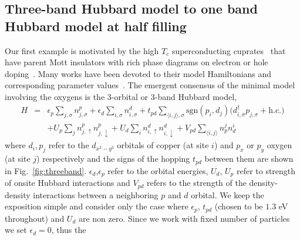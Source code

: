 \subsection{Three-band Hubbard model to one band Hubbard model at half filling}
\label{subsection:3band} 
Our first example is motivated by the high $T_c$ superconducting cuprates~\cite{Bednorz1986} that 
have parent Mott insulators with rich phase diagrams on electron or hole doping~\cite{Dagotto_RevModPhys, LeeWen_RevModPhys}. 
Many works have been devoted to their model Hamiltonians and corresponding parameter 
values~\cite{Emery, ZhangRice, tJSpalek, Hybertsen_PRB1989, Hybertsen_PRB1990, Pavirini, Kent_Hubbard}. 
The emergent consensus of the minimal model involving the oxygens is the 3-orbital or 3-band Hubbard model, 
\begin{eqnarray}
H &=&    \epsilon_p \sum_{j,\sigma} n^{p}_{j,\sigma} + \epsilon_{d} \sum_{i,\sigma}  n^{d}_{i,\sigma} 
	+ t_{pd} \sum_{\langle i,j \rangle, \sigma} \text{sgn}(p_i,d_j) \Big( d_{i,\sigma}^{\dagger} p_{j,\sigma} + \text{h.c.} \Big) \nonumber \\
  & &   + U_p \sum_{j} n^{p}_{j,\uparrow} n^{p}_{j,\downarrow} + U_d \sum_{i} n^{d}_{i,\uparrow} n^{d}_{i,\downarrow} + V_{pd} \sum_{\langle i,j \rangle} n^{j}_p n^{i}_d 
\end{eqnarray}
where $d_i,p_j$ refer to the  $d_{x^2 - y^2}$ orbitals of copper (at site $i$) and $p_x$ or $p_y$ 
oxygen (at site $j$)  respectively and the signs of the hopping $t_{pd}$ between them are shown in Fig.~\ref{fig:threeband}. 
$\epsilon_d$,$\epsilon_p$ refer to the orbital energies, 
$U_d$, $U_p$ refer to strength of onsite Hubbard interactions and $V_{pd}$ refers to the 
strength of the density-density interactions between a neighboring $p$ and $d$ orbital. 
We keep the exposition simple and consider only the case where $\epsilon_p$, $t_{pd}$ (chosen to be $1.3$ eV throughout) 
and $U_{d}$ are non zero. Since we work with fixed number of particles we set $\epsilon_d = 0$, thus the 
